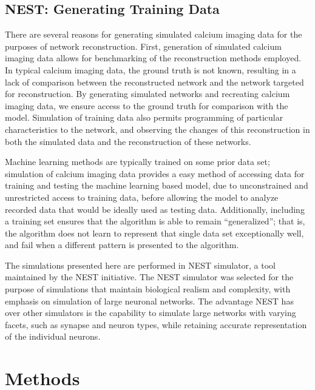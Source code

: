 \documentclass[11pt]{article}
\begin{document}
\subsection{NEST: Generating Training Data}
There are several reasons for generating simulated calcium imaging data for the purposes of network reconstruction. First, generation of simulated calcium imaging data allows for benchmarking of the reconstruction methods employed. In typical calcium imaging data, the ground truth is not known, resulting in a lack of comparison between the reconstructed network and the network targeted for reconstruction. By generating simulated networks and recreating calcium imaging data, we ensure access to the ground truth for comparison with the model. Simulation of training data also permits programming of particular characteristics to the network, and observing the changes of this reconstruction in both the simulated data and the reconstruction of these networks.\par
Machine learning methods are typically trained on some prior data set; simulation of calcium imaging data provides a easy method of accessing data for training and testing the machine learning based model, due to unconstrained and unrestricted access to training data, before allowing the model to analyze recorded data that would be ideally used as testing data. Additionally, including a training set ensures that the algorithm is able to remain “generalized”; that is, the algorithm does not learn to represent that single data set exceptionally well, and fail when a different pattern is presented to the algorithm.\par
The simulations presented here are performed in NEST simulator, a tool maintained by the NEST initiative. The NEST simulator was selected for the purpose of simulations that maintain biological realism and complexity, with emphasis on simulation of large neuronal networks. The advantage NEST has over other simulators is the capability to simulate large networks with varying facets, such as synapse and neuron types, while retaining accurate representation of the individual neurons.\par

\section{Methods}
\end{document}
